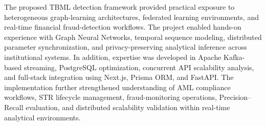 






The proposed TBML detection framework provided practical exposure to heterogeneous graph-learning architectures, federated learning environments, and real-time financial fraud-detection workflows. The project enabled hands-on experience with Graph Neural Networks, temporal sequence modeling, distributed parameter synchronization, and privacy-preserving analytical inference across institutional systems. In addition, expertise was developed in Apache Kafka-based streaming, PostgreSQL optimization, concurrent API scalability analysis, and full-stack integration using Next.js, Prisma ORM, and FastAPI. The implementation further strengthened understanding of AML compliance workflows, STR lifecycle management, fraud-monitoring operations, Precision--Recall evaluation, and distributed scalability validation within real-time analytical environments.
